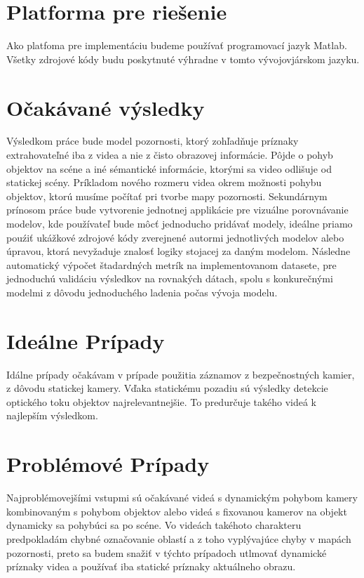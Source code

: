 \section{Platforma pre riešenie}
Ako platfoma pre implementáciu budeme používať programovací jazyk Matlab\textregistered.
Všetky zdrojové kódy budu poskytnuté výhradne v tomto vývojovjárskom jazyku.
\section{Očakávané výsledky}
Výsledkom práce bude model pozornosti, ktorý zohľadňuje príznaky extrahovateľné iba z videa a nie z čisto obrazovej informácie.
Pôjde o pohyb objektov na scéne a iné sémantické informácie, ktorými sa video odlišuje od statickej scény.
Príkladom nového rozmeru videa okrem možnosti pohybu objektov, ktorú musíme počítať pri tvorbe mapy pozornosti.
Sekundárnym prínosom práce bude vytvorenie jednotnej applikácie pre vizuálne porovnávanie modelov, kde používateľ bude môcť jednoducho pridávať modely, ideálne priamo pouźiť ukážkové zdrojové kódy zverejnené autormi jednotlivých modelov alebo úpravou, ktorá nevyžaduje znalosť logiky stojacej za daným modelom.
Následne automatický výpočet štadardných metrík na implementovanom datasete, pre jednoduchú validáciu výsledkov na rovnakých dátach, spolu s konkurečnými modelmi z dôvodu jednoduchého ladenia počas vývoja modelu.
\section{Ideálne Prípady}
Idálne prípady očakávam v prípade použitia záznamov z bezpečnostných kamier, z dôvodu statickej kamery.
Vďaka statickému pozadiu sú výsledky detekcie optického toku objektov najrelevantnejšie.
To predurčuje takého videá k najlepším výsledkom.
\section{Problémové Prípady}
Najproblémovejšími vstupmi sú očakávané videá s dynamickým pohybom kamery kombinovaným s pohybom objektov alebo videá s fixovanou kamerov na objekt dynamicky sa pohybúci sa po scéne.
Vo videách takéhoto charakteru predpokladám chybné označovanie oblastí a z toho vyplývajúce chyby v mapách pozornosti, preto sa budem snažiť v týchto prípadoch utlmovať dynamické príznaky videa a používať iba statické príznaky aktuálneho obrazu.
